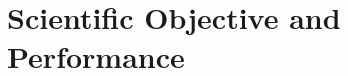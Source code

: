 \documentclass[11pt,twoside,notitlepage]{book}
\begin{document}
\frontmatter

\pagestyle{fancy}

\mainmatter

\setcounter{chapter}{0}
\setcounter{page}{1}

\chapter{Scientific Objective and Performance}





\end{document}
